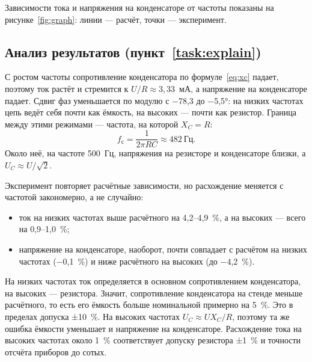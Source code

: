 Зависимости тока и напряжения на конденсаторе от частоты показаны на
рисунке~\ref{fig:graph}: линии — расчёт, точки — эксперимент.


\subsection{Анализ результатов (пункт~\ref{task:explain})}
С ростом частоты сопротивление конденсатора по формуле~\eqref{eq:xc} падает, поэтому ток
растёт и стремится к $U/R \approx 3{,}33$~мА, а напряжение на конденсаторе падает. Сдвиг фаз
уменьшается по модулю с −78,3 до −5,5°: на низких частотах цепь ведёт себя почти как
ёмкость, на высоких — почти как резистор. Граница между этими режимами — частота, на которой
$X_C = R$:
\[
  f_\text{с} = \frac{1}{2\pi R C} \approx 482~\text{Гц}.
\]
Около неё, на частоте 500~Гц, напряжения на резисторе и конденсаторе близки, а
$U_C \approx U / \sqrt{2}$.

Эксперимент повторяет расчётные зависимости, но расхождение меняется с частотой закономерно,
а не случайно:
\begin{itemize}
  \item ток на низких частотах выше расчётного на 4,2–4,9~\%, а на высоких — всего на
  0,9–1,0~\%;
  \item напряжение на конденсаторе, наоборот, почти совпадает с расчётом на низких частотах
  (−0,1~\%) и ниже расчётного на высоких (до −4,2~\%).
\end{itemize}
На низких частотах ток определяется в основном сопротивлением конденсатора, на высоких —
резистора. Значит, сопротивление конденсатора на стенде меньше расчётного, то есть его
ёмкость больше номинальной примерно на 5~\%. Это в пределах допуска ±10~\%. На высоких
частотах $U_C \approx U X_C / R$, поэтому та же ошибка ёмкости уменьшает и напряжение на
конденсаторе. Расхождение тока на высоких частотах около 1~\% соответствует допуску
резистора ±1~\% и точности отсчёта приборов до сотых.
